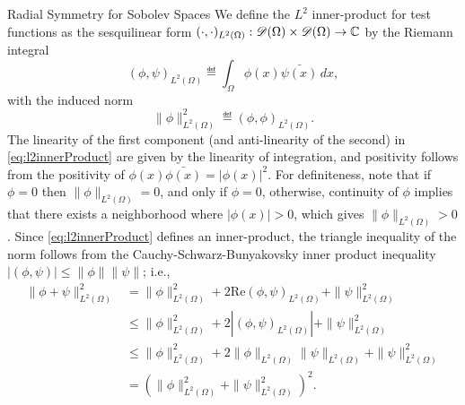 \begin{chapter}{Radial Symmetry for Sobolev Spaces}
We define the $L^2$ inner-product for test functions as the sesquilinear form $(\cdot,\cdot)_{L^2(\Omega)}:\mathscr D(\Omega)\times\mathscr D(\Omega) \to \mathbb C$ by the Riemann integral
\begin{equation} \label{eq:l2innerProduct}
  (\phi,\psi)_{L^2(\Omega)} \eqdef \int_{\Omega} \phi(x)\bar{\psi(x)}\,dx,
\end{equation}
with the induced norm 
\begin{equation} \label{eq:l2norm}
  \|\phi\|^2_{L^2(\Omega)} \eqdef (\phi,\phi)_{L^2(\Omega)}.
\end{equation}
The linearity of the first component (and anti-linearity of the second) in \eqref{eq:l2innerProduct} are given by the linearity of integration, and positivity follows from the positivity of $\phi(x)\bar{\phi(x)} = |\phi(x)|^2$. 
For definiteness, note that if $\phi = 0$ then $\|\phi\|_{L^2(\Omega)} = 0$, and only if $\phi = 0$, otherwise, continuity of $\phi$ implies that there exists a neighborhood where $|\phi(x)| > 0$, which gives $\|\phi\|_{L^2(\Omega)} > 0$.
Since \eqref{eq:l2innerProduct} defines an inner-product, the triangle inequality of the norm follows from the Cauchy-Schwarz-Bunyakovsky inner product inequality $|(\phi,\psi)|\le \|\phi\|\|\psi\|$; i.e.,
\begin{align}
  \|\phi + \psi\|_{L^2(\Omega)}^2 
    &= \|\phi\|_{L^2(\Omega)}^2 + 2\mathrm{Re} (\phi,\psi)_{L^2(\Omega)}  + \|\psi\|_{L^2(\Omega)}^2 \nonumber\\
    &\le \|\phi\|_{L^2(\Omega)}^2 + 2|(\phi,\psi)_{L^2(\Omega)}|  + \|\psi\|_{L^2(\Omega)}^2 \nonumber\\
    &\le \|\phi\|_{L^2(\Omega)}^2 + 2\|\phi\|_{L^2(\Omega)}\|\psi\|_{L^2(\Omega)}  + \|\psi\|_{L^2(\Omega)}^2 \nonumber \\
    &= \left(\|\phi\|_{L^2(\Omega)}^2 + \|\psi\|_{L^2(\Omega)}^2\right)^2.
\end{align}


\end{chapter}
